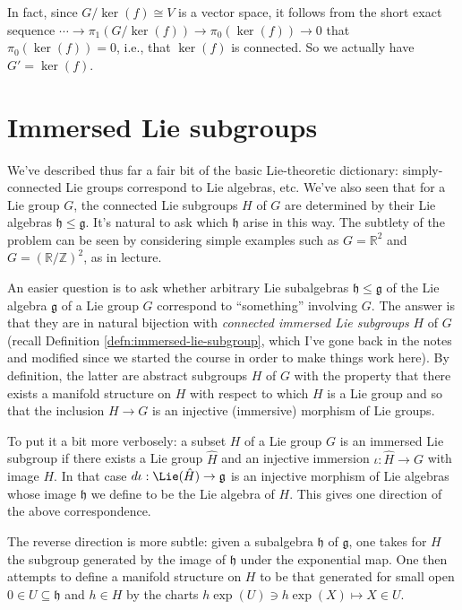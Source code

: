 \documentclass[reqno]{amsart} 
\begin{document}
In fact, since $G/\ker(f) \cong V$ is a vector space, it follows from the short exact sequence $\dotsb \rightarrow \pi_1(G/\ker(f)) \rightarrow \pi_0(\ker(f)) \rightarrow 0$ that $\pi_0(\ker(f)) = 0$, i.e., that $\ker(f)$ is connected.  So we actually have $G' = \ker(f)$.

\section{Immersed Lie subgroups}
\label{sec:org1df5b23}
We've described thus far a fair bit of the basic Lie-theoretic dictionary: simply-connected Lie groups correspond to Lie algebras, etc.  We've also seen that for a Lie group $G$, the connected Lie subgroups $H$ of $G$ are determined by their Lie algebras $\mathfrak{h} \leq \mathfrak{g}$.  It's natural to ask which $\mathfrak{h}$ arise in this way.  The subtlety of the problem can be seen by considering simple examples such as $G = \mathbb{R}^2$ and $G = (\mathbb{R}/\mathbb{Z})^2$, as in lecture.

An easier question is to ask whether arbitrary Lie subalgebras $\mathfrak{h} \leq \mathfrak{g}$ of the Lie algebra $\mathfrak{g}$ of a Lie group $G$ correspond to ``something'' involving $G$.  The answer is that they are in natural bijection with \emph{connected immersed Lie subgroups} $H$ of $G$ (recall Definition \ref{defn:immersed-lie-subgroup}, which I've gone back in the notes and modified since we started the course in order to make things work here).  By definition, the latter are abstract subgroups $H$ of $G$ with the property that there exists a manifold structure on $H$ with respect to which $H$ is a Lie group and so that the inclusion $H \rightarrow G$ is an injective (immersive) morphism of Lie groups.

To put it a bit more verbosely: a subset $H$ of a Lie group $G$ is an immersed Lie subgroup if there exists a Lie group $\hat{H}$ and an injective immersion $\iota : \hat{H} \rightarrow G$ with image $H$.  In that case $d \iota : \Lie(\hat{H}) \rightarrow \mathfrak{g}$ is an injective morphism of Lie algebras whose image $\mathfrak{h}$ we define to be the Lie algebra of $H$.  This gives one direction of the above correspondence.

The reverse direction is more subtle: given a subalgebra $\mathfrak{h}$ of $\mathfrak{g}$, one takes for $H$ the subgroup generated by the image of $\mathfrak{h}$ under the exponential map.  One then attempts to define a manifold structure on $H$ to be that generated for small open $0 \in U \subseteq \mathfrak{h}$ and $h \in H$ by the charts $h \exp(U) \ni h \exp(X) \mapsto X \in U$.
\end{document}
